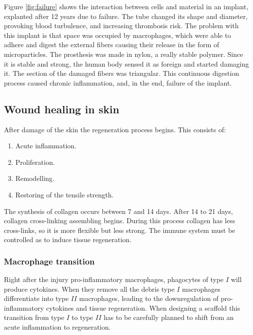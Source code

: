 		Figure \ref{fig:failure} shows the interaction between cells and material in an implant, explanted after 12 years due to failure.
		The tube changed its shape and diameter, provoking blood turbulence, and increasing thrombosis risk.
		The problem with this implant is that space was occupied by macrophages, which were able to adhere and digest the external fibers causing their release in the form of microparticles.
		The prosthesis was made in nylon, a really stable polymer.
		Since it is stable and strong, the human body sensed it as foreign and started damaging it.
		The section of the damaged fibers was triangular.
		This continuous digestion process caused chronic inflammation, and, in the end, failure of the implant.

	\subsection{Wound healing in skin}
	After damage of the skin the regeneration process begins.
	This consists of:

	\begin{multicols}{2}
		\begin{enumerate}
			\item Acute inflammation.
			\item Proliferation.
			\item Remodelling.
			\item Restoring of the tensile strength.
		\end{enumerate}
	\end{multicols}

	The synthesis of collagen occurs between 7 and 14 days.
	After 14 to 21 days, collagen cross-linking assembling begins.
	During this process collagen has less cross-links, so it is more flexible but less strong.
	The immune system must be controlled as to induce tissue regeneration.

		\subsubsection{Macrophage transition}
		Right after the injury pro-inflammatory macrophages, phagocytes of type $I$ will produce cytokines.
		When they remove all the debris type $I$ macrophages differentiate into type $II$ macrophages, leading to the downregulation of pro-inflammatory cytokines and tissue regeneration.
		When designing a scaffold this transition from type $I$ to type $II$ has to be carefully planned to shift from an acute inflammation to regeneration.

